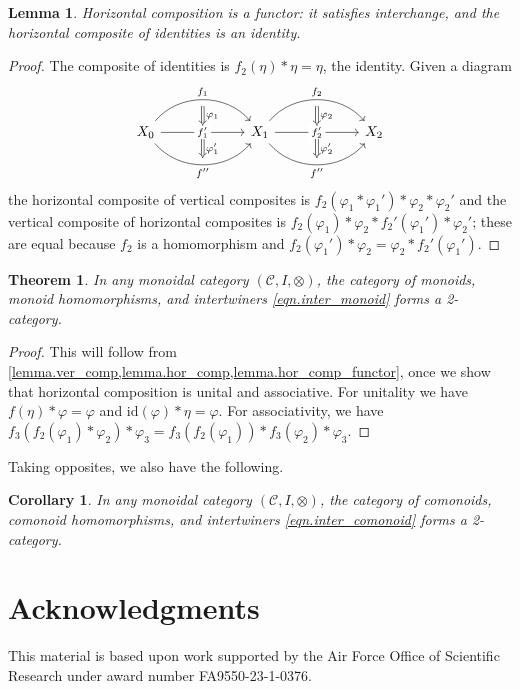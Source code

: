 \documentclass[11pt, one side, article]{memoir}
\theoremstyle{definition}
\theoremstyle{plain}
\newtheorem{theorem}[definitionx]{Theorem}
\newtheorem{corollary}[definitionx]{Corollary}
\newtheorem{lemma}[definitionx]{Lemma}
\newcommand{\cat}[1]{\mathcal{#1}}%
\newcommand{\id}{\mathrm{id}}
\newcommand{\0}{\textsf{0}}
\newcommand{\1}{\tn{\textsf{1}}}
\begin{document}
\begin{lemma}\label{lemma.hor_comp_functor}
Horizontal composition is a functor: it satisfies interchange, and the horizontal composite of identities is an identity.
\end{lemma}
\begin{proof}
The composite of identities is $f_2(\eta)*\eta=\eta$, the identity. Given a diagram
\[
\begin{tikzcd}[column sep=60pt]
	X_0\ar[r, bend left=50pt, "f_1", ""' name=a1]\ar[r, "f_1'" description, "" name=b11, ""' name=b12]\ar[r, bend right=50pt, "f''"', "" name=c1]&
	X_1\ar[r, bend left=50pt, "f_2", ""' name=a2]\ar[r, "f_2'" description, "" name=b21, ""' name=b22]\ar[r, bend right=50pt, "f''"', "" name=c2]&
	X_2
	\ar[from=a1, to=b11, Rightarrow, "\varphi_1"]
	\ar[from=b12, to=c1, Rightarrow, "\varphi_1'"]
	\ar[from=a2, to=b21, Rightarrow, "\varphi_2"]
	\ar[from=b22, to=c2, Rightarrow, "\varphi_2'"]
\end{tikzcd}
\]
the horizontal composite of vertical composites is $f_2(\varphi_1*\varphi_1')*\varphi_2*\varphi_2'$ and the vertical composite of horizontal composites is $f_2(\varphi_1)*\varphi_2*f_2'(\varphi_1')*\varphi_2'$; these are equal because $f_2$ is a homomorphism and $f_2(\varphi_1')*\varphi_2=\varphi_2*f_2'(\varphi_1')$.
\end{proof}

\begin{theorem}\label{thm.main}
In any monoidal category $(\cat{C},I,\otimes)$, the category of monoids, monoid homomorphisms, and intertwiners \eqref{eqn.inter_monoid} forms a 2-category.
\end{theorem}
\begin{proof}
This will follow from \cref{lemma.ver_comp,lemma.hor_comp,lemma.hor_comp_functor}, once we show that horizontal composition is unital and associative. For unitality we have $f(\eta)*\varphi=\varphi$ and $\id(\varphi)*\eta=\varphi$. For associativity, we have $f_3(f_2(\varphi_1)*\varphi_2)*\varphi_3=f_3(f_2(\varphi_1))*f_3(\varphi_2)*\varphi_3$.
\end{proof}

Taking opposites, we also have the following.

\begin{corollary}\label{cor.main}
In any monoidal category $(\cat{C},I,\otimes)$, the category of comonoids, comonoid homomorphisms, and intertwiners \eqref{eqn.inter_comonoid} forms a 2-category.
\end{corollary}

\section*{Acknowledgments}
This material is based upon work supported by the Air Force Office of Scientific Research under award number FA9550-23-1-0376.

\printbibliography 
\end{document}
